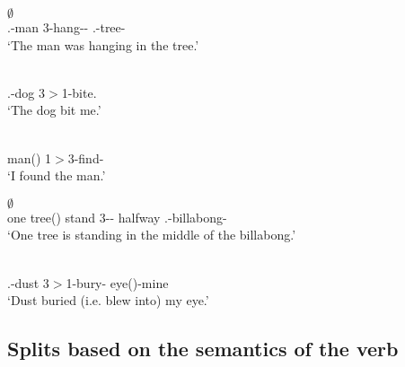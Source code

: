 \begin{exe} \ex\label{MangM}
 \begin{xlist} \ex\label{MangMS}  \gll {} $\emptyset$ \\
 \nom{}.\mas{}-man 3\sg{}-hang-\Mid{}-\pstcont{} \loc{}.\neu{}-tree-\loc{}\\
\glt `The man was hanging in the tree.'
 
 \ex\label{MangMA} \gll {} \\
 \nom{}.\mas{}-dog 3\sg{}$>$1\sg{}-bite.\pstpunc{}\\
\glt `The dog bit me.' 
 
 \ex\label{MangMP} \gll {} \\
 man(\mas{}) 1\sg{}$>$3\sg{}-find-\pstpunc{}\\
\glt `I found the man.'
 \end{xlist}
 \end{exe}
  
\begin{exe} \ex\label{MangN}
\begin{xlist} 
\ex\raggedright\label{MangNS} \gll {}   $\emptyset$  \\
one tree(\neu{}) stand 3\sg{}-\aux{}-\pstcont{} halfway \loc{}.\neu{}-billabong-\loc{}\\
\glt `One tree is standing in the middle of the billabong.'

\ex\label{MangNAP} \gll {}  \\
\erg{}.\neu{}-dust 3\sg{}$>$1\sg{}-bury-\pstpunc{}  eye(\neu{})-mine\\
\glt `Dust buried (i.e. blew into) my eye.'
\end{xlist}
\end{exe}

\subsection{Splits based on the semantics of the verb}\label{splitsemverb}

